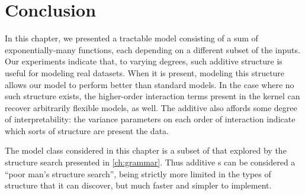 \section{Conclusion}

In this chapter, we presented a tractable \gp{} model consisting of a sum of exponentially-many functions, each depending on a different subset of the inputs.
Our experiments indicate that, to varying degrees, such additive structure is useful for modeling real datasets.
When it is present, modeling this structure allows our model to perform better than standard \gp{} models.
In the case where no such structure exists, the higher-order interaction terms present in the kernel can recover arbitrarily flexible models, as well.
The additive \gp{} also affords some degree of interpretability: the variance parameters on each order of interaction indicate which sorts of structure are present the data.

The model class considered in this chapter is a subset of that explored by the structure search presented in \cref{ch:grammar}.
Thus additive \gp{}s can be considered a ``poor man's structure search'', being strictly more limited in the types of structure that it can discover, but much faster and simpler to implement.



\outbpdocument{


}





%
%





 
 

